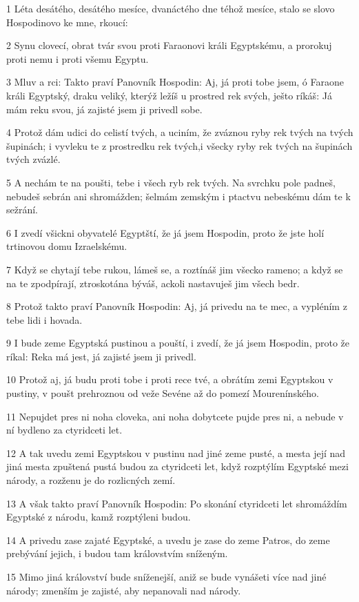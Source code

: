 \par 1 Léta desátého, desátého mesíce, dvanáctého dne téhož mesíce, stalo se slovo Hospodinovo ke mne, rkoucí:
\par 2 Synu clovecí, obrat tvár svou proti Faraonovi králi Egyptskému, a prorokuj proti nemu i proti všemu Egyptu.
\par 3 Mluv a rci: Takto praví Panovník Hospodin: Aj, já proti tobe jsem, ó Faraone králi Egyptský, draku veliký, kterýž ležíš u prostred rek svých, ješto ríkáš: Já mám reku svou, já zajisté jsem ji privedl sobe.
\par 4 Protož dám udici do celistí tvých, a uciním, že zváznou ryby rek tvých na tvých šupinách; i vyvleku te z prostredku rek tvých,i všecky ryby rek tvých na šupinách tvých zvázlé.
\par 5 A nechám te na poušti, tebe i všech ryb rek tvých. Na svrchku pole padneš, nebudeš sebrán ani shromážden; šelmám zemským i ptactvu nebeskému dám te k sežrání.
\par 6 I zvedí všickni obyvatelé Egyptští, že já jsem Hospodin, proto že jste holí trtinovou domu Izraelskému.
\par 7 Když se chytají tebe rukou, lámeš se, a roztínáš jim všecko rameno; a když se na te zpodpírají, ztroskotána býváš, ackoli nastavuješ jim všech bedr.
\par 8 Protož takto praví Panovník Hospodin: Aj, já privedu na te mec, a vypléním z tebe lidi i hovada.
\par 9 I bude zeme Egyptská pustinou a pouští, i zvedí, že já jsem Hospodin, proto že ríkal: Reka má jest, já zajisté jsem ji privedl.
\par 10 Protož aj, já budu proti tobe i proti rece tvé, a obrátím zemi Egyptskou v pustiny, v poušt prehroznou od veže Sevéne až do pomezí Mourenínského.
\par 11 Nepujdet pres ni noha cloveka, ani noha dobytcete pujde pres ni, a nebude v ní bydleno za ctyridceti let.
\par 12 A tak uvedu zemi Egyptskou v pustinu nad jiné zeme pusté, a mesta její nad jiná mesta zpuštená pustá budou za ctyridceti let, když rozptýlím Egyptské mezi národy, a rozženu je do rozlicných zemí.
\par 13 A však takto praví Panovník Hospodin: Po skonání ctyridceti let shromáždím Egyptské z národu, kamž rozptýleni budou.
\par 14 A privedu zase zajaté Egyptské, a uvedu je zase do zeme Patros, do zeme prebývání jejich, i budou tam královstvím sníženým.
\par 15 Mimo jiná království bude sníženejší, aniž se bude vynášeti více nad jiné národy; zmenším je zajisté, aby nepanovali nad národy.
